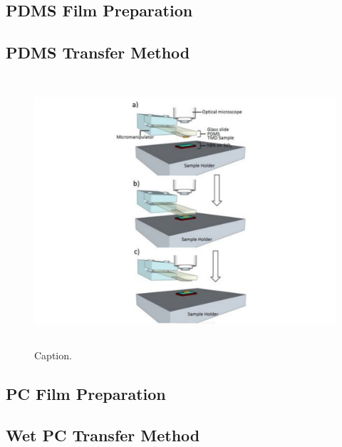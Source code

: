 \subsection{PDMS Film Preparation}\label{subsec:pdms_prep}

\subsection{PDMS Transfer Method}\label{subsec:pdms_transfer}

\begin{figure}[ht]
    \centering
    \includegraphics[height=10cm,width=14cm]{transfer_schematic}
    \caption[Schematic and process used for general \acs{PMDS} transfers]
    {
        Caption.
    }
    \label{fig:transfer_schematic}
\end{figure}

\subsection{PC Film Preparation}\label{subsec:pc_prep}

\subsection{Wet PC Transfer Method}\label{subsec:wet_pc_transfer}

